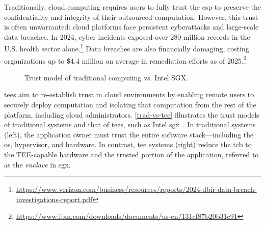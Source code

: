 Traditionally, cloud computing requires users to fully trust the \gls{csp} to preserve the confidentiality and integrity of their outsourced computation.
However, this trust is often unwarranted: cloud platforms face persistent cyberattacks and large-scale data breaches.
In 2024, cyber incidents exposed over 280 million records in the U.S. health sector alone.\footnote{\url{https://www.verizon.com/business/resources/reports/2024-dbir-data-breach-investigations-report.pdf}}
Data breaches are also financially damaging, costing organizations up to \$4.4 million on average in remediation efforts as of 2025.\footnote{\url{https://www.ibm.com/downloads/documents/us-en/131cf87b20b31c91}}

\begin{figure}[t]
    \centering

\caption{Trust model of traditional computing vs. Intel SGX.}\label{trad-vs-tee}
\end{figure}

\Glspl{tee} aim to re-establish trust in cloud environments by enabling remote users to securely deploy computation and isolating that computation from the rest of the platform, including cloud administrators.
\autoref{trad-vs-tee} illustrates the trust models of traditional systems and that of \glspl{tee}, such as Intel \gls{sgx}~\cite{costan_intel_2016}.
In traditional systems (left), the application owner must trust the entire software stack—including the \gls{os}, hypervisor, and hardware.
In contrast, \gls{tee} systems (right) reduce the \gls{tcb} to the TEE-capable hardware and the trusted portion of the application, referred to as the \emph{enclave} in \gls{sgx}.


